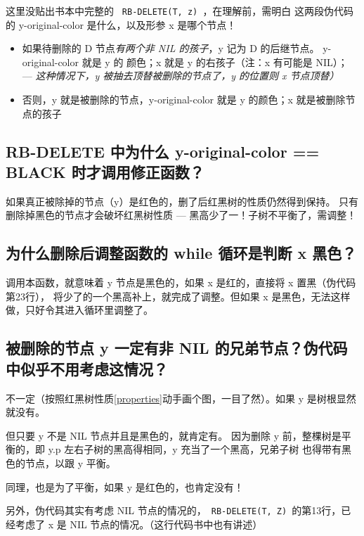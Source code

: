 \documentclass[a4paper, 11pt]{article}
\begin{document}
这里没贴出书本中完整的 \verb| RB-DELETE(T, z) |，在理解前，需明白
这两段伪代码的 y-original-color 是什么，以及形参 x 是哪个节点！\par

\begin{itemize}

\item 如果待删除的 D 节点\emph{有两个非 NIL 的孩子}，y 记为 D 的后继节点。
y-original-color 就是 y 的 颜色；x 就是 y 的右孩子（注：x 有可能是 NIL）；
--- \emph{这种情况下，y 被抽去顶替被删除的节点了，y 的位置则 x 节点顶替）}

\item 否则，y 就是被删除的节点，y-original-color 就是 y 的颜色；x 就是被删除节点的孩子

\end{itemize}

\subsection{RB-DELETE 中为什么 y-original-color == BLACK 时才调用修正函数？}\label{sec:del:why}
如果真正被除掉的节点（y）是红色的，删了后红黑树的性质仍然得到保持。
只有删除掉黑色的节点才会破坏红黑树性质 --- 黑高少了一！子树不平衡了，需调整！

\subsection{为什么删除后调整函数的 while 循环是判断 x 黑色？}
调用本函数，就意味着 y 节点是黑色的，如果 x 是红的，直接将 x 置黑（伪代码第23行），
将少了的一个黑高补上，就完成了调整。但如果 x 是黑色，无法这样做，只好令其进入循环里调整了。

\subsection{被删除的节点 y 一定有非 NIL 的兄弟节点？伪代码中似乎不用考虑这情况？}
不一定（按照红黑树性质\ref{properties}动手画个图，一目了然）。如果 y 是树根显然就没有。 \par
但只要 y 不是 NIL 节点并且是黑色的，就肯定有。
因为删除 y 前，整棵树是平衡的，即 y.p 左右子树的黑高得相同，y 充当了一个黑高，兄弟子树
也得带有黑色的节点，以跟 y 平衡。\par 
同理，也是为了平衡，如果 y 是红色的，也肯定没有！\par

另外，伪代码其实有考虑 NIL 节点的情况的，\verb| RB-DELETE(T, Z) |的第13行，已经考虑了
x 是 NIL 节点的情况。（这行代码书中\cite{algorithm:intro}也有讲述）
\end{document}

